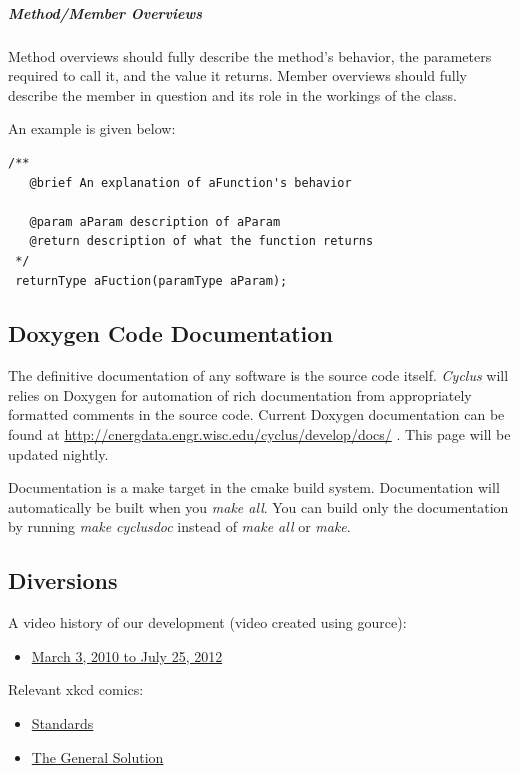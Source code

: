 \documentclass[letterpaper,10pt,english]{sphinxmanual}
\begin{document}
\subparagraph{Method/Member Overviews}
\label{devdoc/style_guide:method-member-overviews}
Method overviews should fully describe the method's behavior, the parameters
required to call it, and the value it returns. Member overviews should fully describe
the member in question and its role in the workings of the class.

An example is given below:

\begin{Verbatim}[commandchars=\\\{\}]
/**
   @brief An explanation of aFunction's behavior

   @param aParam description of aParam
   @return description of what the function returns
 */
 returnType aFuction(paramType aParam);
\end{Verbatim}


\subsection{Doxygen Code Documentation}
\label{devdoc/main:doxygen-code-documentation}
The definitive documentation of any software is the source code itself.
\emph{Cyclus} will relies on Doxygen for automation of rich documentation from
appropriately formatted comments in the source code. Current Doxygen
documentation can be found at \href{http://cnergdata.engr.wisc.edu/cyclus/develop/docs/}{http://cnergdata.engr.wisc.edu/cyclus/develop/docs/} .
This page will be updated nightly.

Documentation is a make target in the cmake build system. Documentation
will automatically be built when you \emph{make all}. You can build only the
documentation by running \emph{make cyclusdoc} instead of \emph{make all} or \emph{make}.


\subsection{Diversions}
\label{devdoc/main:diversions}
A video history of our development (video created using gource):
\begin{itemize}
\item {} 
\href{http://www.youtube.com/watch?v=-2uQia2e\_cg}{March 3, 2010 to July 25, 2012}

\end{itemize}

Relevant xkcd comics:
\begin{itemize}
\item {} 
\href{http://xkcd.com/927/}{Standards}

\item {} 
\href{http://xkcd.com/974/}{The General Solution}

\end{itemize}
\end{document}
